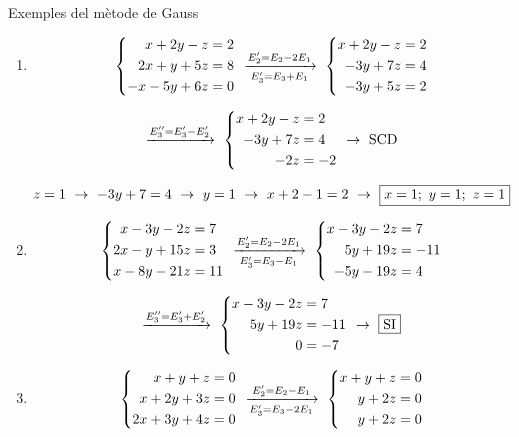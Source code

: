\documentclass[11pt,a4paper]{article}
\newcommand{\fmdisp}[1]{\[\setbox2=\hbox{$\displaystyle #1$}\ifdim\wd2>\linewidth\resizebox{\linewidth}{!}{\box2}\else\box2\fi\]}
\begin{document}
\begin{fmex}{Exemples del mètode de Gauss}
\begin{enumerate}[label=\textbf{\arabic*.},leftmargin=*]
\item
\fmdisp{\left\{\begin{aligned}x+2y-z&=2\\ 2x+y+5z&=8\\ -x-5y+6z&=0\end{aligned}\right.\ \xrightarrow[E_3'=E_3+E_1]{E_2'=E_2-2E_1}\ \left\{\begin{aligned}x+2y-z&=2\\ -3y+7z&=4\\ -3y+5z&=2\end{aligned}\right.}

\fmdisp{\xrightarrow{E_3''=E_3'-E_2'}\ \left\{\begin{aligned}x+2y-z&=2\\ -3y+7z&=4\\ -2z&=-2\end{aligned}\right.\ \rightarrow\ \text{SCD}}

\fmdisp{z=1\ \rightarrow\ -3y+7=4\ \rightarrow\ y=1\ \rightarrow\ x+2-1=2\ \rightarrow\ \boxed{x=1;\ y=1;\ z=1}}

\item
\fmdisp{\left\{\begin{aligned}x-3y-2z&=7\\ 2x-y+15z&=3\\ x-8y-21z&=11\end{aligned}\right.\ \xrightarrow[E_3'=E_3-E_1]{E_2'=E_2-2E_1}\ \left\{\begin{aligned}x-3y-2z&=7\\ 5y+19z&=-11\\ -5y-19z&=4\end{aligned}\right.}

\fmdisp{\xrightarrow{E_3''=E_3'+E_2'}\ \left\{\begin{aligned}x-3y-2z&=7\\ 5y+19z&=-11\\ 0&=-7\end{aligned}\right.\ \rightarrow\ \boxed{\text{SI}}}

\item
\fmdisp{\left\{\begin{aligned}x+y+z&=0\\ x+2y+3z&=0\\ 2x+3y+4z&=0\end{aligned}\right.\ \xrightarrow[E_3'=E_3-2E_1]{E_2'=E_2-E_1}\ \left\{\begin{aligned}x+y+z&=0\\ y+2z&=0\\ y+2z&=0\end{aligned}\right.}


\end{enumerate}
\end{fmex}
\end{document}
